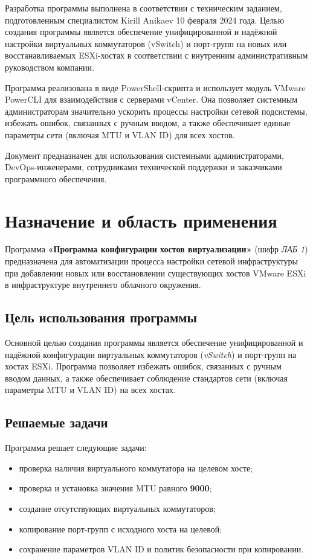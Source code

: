 Разработка программы выполнена в соответствии с техническим заданием, подготовленным специалистом Kirill Anikaev 10 февраля 2024 года. Целью создания программы является обеспечение унифицированной и надёжной настройки виртуальных коммутаторов (vSwitch) и порт-групп на новых или восстанавливаемых ESXi-хостах в соответствии с внутренним административным руководством компании.

Программа реализована в виде PowerShell-скрипта и использует модуль VMware PowerCLI для взаимодействия с серверами vCenter. Она позволяет системным администраторам значительно ускорить процессы настройки сетевой подсистемы, избежать ошибок, связанных с ручным вводом, а также обеспечивает единые параметры сети (включая MTU и VLAN ID) для всех хостов.

Документ предназначен для использования системными администраторами, DevOps-инженерами, сотрудниками технической поддержки и заказчиками программного обеспечения.
\newpage
\section{Назначение и область применения}

Программа \textbf{«Программа конфигурации хостов виртуализации»} (шифр \textit{ЛАБ 1}) предназначена для автоматизации процесса настройки сетевой инфраструктуры при добавлении новых или восстановлении существующих хостов VMware ESXi в инфраструктуре внутреннего облачного окружения.

\subsection{Цель использования программы}

Основной целью создания программы является обеспечение унифицированной и надёжной конфигурации виртуальных коммутаторов (\textit{vSwitch}) и порт-групп на хостах ESXi. Программа позволяет избежать ошибок, связанных с ручным вводом данных, а также обеспечивает соблюдение стандартов сети (включая параметры MTU и VLAN ID) на всех хостах.

\subsection{Решаемые задачи}
Программа решает следующие задачи:
\begin{itemize}
\item проверка наличия виртуального коммутатора на целевом хосте;
\item проверка и установка значения MTU равного \textbf{9000};
\item создание отсутствующих виртуальных коммутаторов;
\item копирование порт-групп с исходного хоста на целевой;
\item сохранение параметров VLAN ID и политик безопасности при копировании.
\end{itemize}

